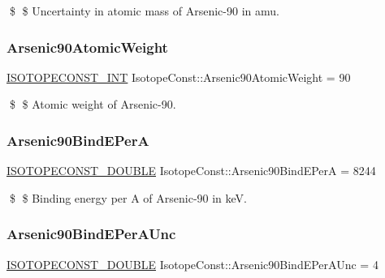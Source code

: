 \$ \$ Uncertainty in atomic mass of Arsenic-\/90 in amu. \mbox{\label{group___isotope_const-_arsenic-_as90_gae921df23e216ad75ee4d28ced869cd00}} 
\subsubsection{\texorpdfstring{Arsenic90\+Atomic\+Weight}{Arsenic90AtomicWeight}}
{\footnotesize\ttfamily \mbox{\hyperlink{group___isotope_const-_macros_ga5f18360b3e99483a35c32d789e62621c}{I\+S\+O\+T\+O\+P\+E\+C\+O\+N\+S\+T\+\_\+\+I\+NT}} Isotope\+Const\+::\+Arsenic90\+Atomic\+Weight = 90}

\$ \$ Atomic weight of Arsenic-\/90. \mbox{\label{group___isotope_const-_arsenic-_as90_ga3d9ecb034b32e8eba7824dc4d19ab23a}} 
\subsubsection{\texorpdfstring{Arsenic90\+Bind\+E\+PerA}{Arsenic90BindEPerA}}
{\footnotesize\ttfamily \mbox{\hyperlink{group___isotope_const-_macros_ga8f45a7272ce02c0b4c65c44636ed719a}{I\+S\+O\+T\+O\+P\+E\+C\+O\+N\+S\+T\+\_\+\+D\+O\+U\+B\+LE}} Isotope\+Const\+::\+Arsenic90\+Bind\+E\+PerA = 8244}

\$ \$ Binding energy per A of Arsenic-\/90 in keV. \mbox{\label{group___isotope_const-_arsenic-_as90_gaf748038473d98170992b37dfc806acff}} 
\subsubsection{\texorpdfstring{Arsenic90\+Bind\+E\+Per\+A\+Unc}{Arsenic90BindEPerAUnc}}
{\footnotesize\ttfamily \mbox{\hyperlink{group___isotope_const-_macros_ga8f45a7272ce02c0b4c65c44636ed719a}{I\+S\+O\+T\+O\+P\+E\+C\+O\+N\+S\+T\+\_\+\+D\+O\+U\+B\+LE}} Isotope\+Const\+::\+Arsenic90\+Bind\+E\+Per\+A\+Unc = 4}

